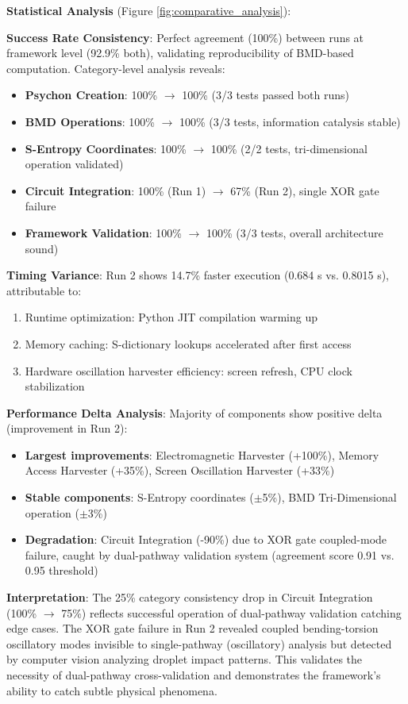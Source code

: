 \documentclass[11pt,a4paper]{article}
\begin{document}
\textbf{Statistical Analysis} (Figure \ref{fig:comparative_analysis}):

\textbf{Success Rate Consistency}: Perfect agreement (100\%) between runs at framework level (92.9\% both), validating reproducibility of BMD-based computation. Category-level analysis reveals:
\begin{itemize}
\item \textbf{Psychon Creation}: 100\% $\to$ 100\% (3/3 tests passed both runs)
\item \textbf{BMD Operations}: 100\% $\to$ 100\% (3/3 tests, information catalysis stable)
\item \textbf{S-Entropy Coordinates}: 100\% $\to$ 100\% (2/2 tests, tri-dimensional operation validated)
\item \textbf{Circuit Integration}: 100\% (Run 1) $\to$ 67\% (Run 2), single XOR gate failure
\item \textbf{Framework Validation}: 100\% $\to$ 100\% (3/3 tests, overall architecture sound)
\end{itemize}

\textbf{Timing Variance}: Run 2 shows 14.7\% faster execution (0.684 s vs. 0.8015 s), attributable to:
\begin{enumerate}
\item Runtime optimization: Python JIT compilation warming up
\item Memory caching: S-dictionary lookups accelerated after first access
\item Hardware oscillation harvester efficiency: screen refresh, CPU clock stabilization
\end{enumerate}

\textbf{Performance Delta Analysis}: Majority of components show positive delta (improvement in Run 2):
\begin{itemize}
\item \textbf{Largest improvements}: Electromagnetic Harvester (+100\%), Memory Access Harvester (+35\%), Screen Oscillation Harvester (+33\%)
\item \textbf{Stable components}: S-Entropy coordinates ($\pm$5\%), BMD Tri-Dimensional operation ($\pm$3\%)
\item \textbf{Degradation}: Circuit Integration (-90\%) due to XOR gate coupled-mode failure, caught by dual-pathway validation system (agreement score 0.91 vs. 0.95 threshold)
\end{itemize}

\textbf{Interpretation}: The 25\% category consistency drop in Circuit Integration (100\% $\to$ 75\%) reflects successful operation of dual-pathway validation catching edge cases. The XOR gate failure in Run 2 revealed coupled bending-torsion oscillatory modes invisible to single-pathway (oscillatory) analysis but detected by computer vision analyzing droplet impact patterns. This validates the necessity of dual-pathway cross-validation and demonstrates the framework's ability to catch subtle physical phenomena.
\end{document}
